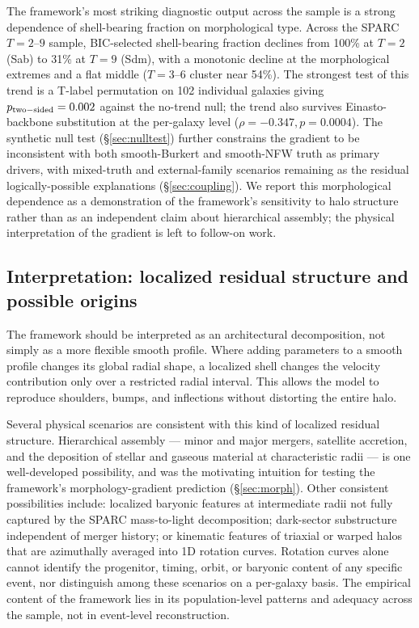 \documentclass[linenumbers]{aastex701}
\begin{document}
The framework's most striking diagnostic output across the sample is a strong dependence of shell-bearing fraction on morphological type. Across the SPARC $T=2$--$9$ sample, BIC-selected shell-bearing fraction declines from 100\% at $T=2$ (Sab) to 31\% at $T=9$ (Sdm), with a monotonic decline at the morphological extremes and a flat middle ($T=3$--$6$ cluster near 54\%). The strongest test of this trend is a T-label permutation on 102 individual galaxies giving $p_{\rm two-sided} = 0.002$ against the no-trend null; the trend also survives Einasto-backbone substitution at the per-galaxy level ($\rho = -0.347, p = 0.0004$). The synthetic null test (\S\ref{sec:nulltest}) further constrains the gradient to be inconsistent with both smooth-Burkert and smooth-NFW truth as primary drivers, with mixed-truth and external-family scenarios remaining as the residual logically-possible explanations (\S\ref{sec:coupling}). We report this morphological dependence as a demonstration of the framework's sensitivity to halo structure rather than as an independent claim about hierarchical assembly; the physical interpretation of the gradient is left to follow-on work.

\subsection{Interpretation: localized residual structure and possible origins}\label{sec:interp}

The framework should be interpreted as an architectural decomposition, not simply as a more flexible smooth profile. Where adding parameters to a smooth profile changes its global radial shape, a localized shell changes the velocity contribution only over a restricted radial interval. This allows the model to reproduce shoulders, bumps, and inflections without distorting the entire halo.

Several physical scenarios are consistent with this kind of localized residual structure. Hierarchical assembly --- minor and major mergers, satellite accretion, and the deposition of stellar and gaseous material at characteristic radii --- is one well-developed possibility, and was the motivating intuition for testing the framework's morphology-gradient prediction (\S\ref{sec:morph}). Other consistent possibilities include: localized baryonic features at intermediate radii not fully captured by the SPARC mass-to-light decomposition; dark-sector substructure independent of merger history; or kinematic features of triaxial or warped halos that are azimuthally averaged into 1D rotation curves. Rotation curves alone cannot identify the progenitor, timing, orbit, or baryonic content of any specific event, nor distinguish among these scenarios on a per-galaxy basis. The empirical content of the framework lies in its population-level patterns and adequacy across the sample, not in event-level reconstruction.
\end{document}
